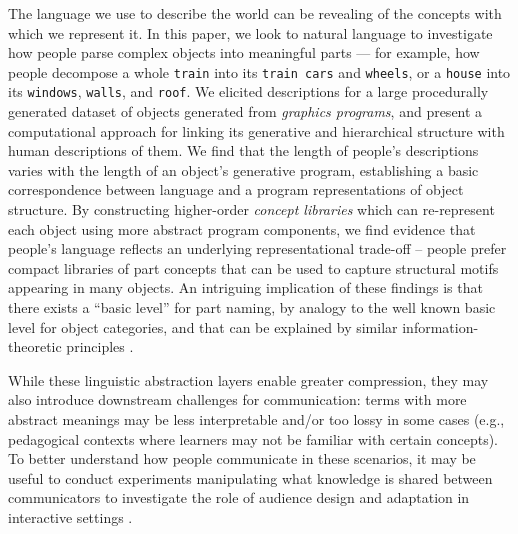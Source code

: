 \documentclass[10pt,letterpaper]{article}
\begin{document}
The language we use to describe the world can be revealing of the concepts with which we represent it.
In this paper, we look to natural language to investigate how people parse complex objects into meaningful parts --- for example, how people decompose a whole \texttt{train} into its \texttt{train cars} and \texttt{wheels}, or a \texttt{house} into its \texttt{windows}, \texttt{walls}, and \texttt{roof}.
We elicited descriptions for a large procedurally generated dataset of objects generated from \textit{graphics programs}, and present a computational approach for linking its generative and hierarchical structure with human descriptions of them. 
We find that the length of people's descriptions varies with the length of an object's generative program, establishing a basic correspondence between language and a program representations of object structure. 
By constructing higher-order \textit{concept libraries} which can re-represent each object using more abstract program components, we find evidence that people's language reflects an underlying representational trade-off -- people prefer compact libraries of part concepts that can be used to capture structural motifs appearing in many objects. 
An intriguing implication of these findings is that there exists a ``basic level'' for part naming, by analogy to the well known basic level for object categories, and that can be explained by similar information-theoretic principles .

While these linguistic abstraction layers enable greater compression, they may also introduce downstream challenges for communication: terms with more abstract meanings may be less interpretable and/or too lossy in some cases (e.g., pedagogical contexts where learners may not be familiar with certain concepts).
To better understand how people communicate in these scenarios, it may be useful to conduct experiments manipulating what knowledge is shared between communicators to investigate the role of audience design and adaptation in interactive settings .
\end{document}
